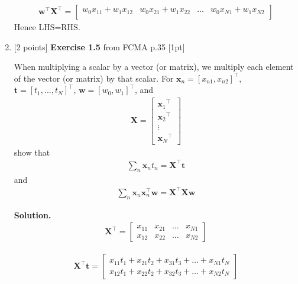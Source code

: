 \documentclass[10pt]{article}
\begin{document}
\begin{enumerate}
\begin{eqnarray*}
\mathbf{w}^\top\mathbf{X}^\top = 
    \begin{bmatrix}
    w_0 x_{11}+w_1x_{12}  & w_0x_{21}+w_1x_{22} & \hdots & w_0x_{N1}+w_1x_{N2}\\[0.3em]
    \end{bmatrix}
\end{eqnarray*}
Hence LHS=RHS.\\

\item \label{prob:5} [2 points]
{\bf Exercise 1.5} from FCMA p.35  [1pt]

When multiplying a scalar by a vector (or matrix), we multiply each element of the vector (or matrix) by that scalar.  For $\mathbf{x}_n = {[ x_{n1}, x_{n2} ]}^\top$, $\mathbf{t} = {[ t_1,...,t_N ]}^\top$, $\mathbf{w} = {[ w_0, w_1 ]}^\top$, and
\begin{eqnarray*}
\mathbf{X} = 
    \begin{bmatrix}
    {\mathbf{x}_{1}}^\top \\[0.3em]
    {\mathbf{x}_{2}}^\top \\[0.3em]
    \vdots \\[0.3em]
    {\mathbf{x}_{N}}^\top
    \end{bmatrix}
\end{eqnarray*}
show that
\begin{eqnarray*}
\sum_{n} \mathbf{x}_n t_n = \mathbf{X}^\top\mathbf{t}
\end{eqnarray*}
and
\begin{eqnarray*}
\sum_{n} \mathbf{x}_n \mathbf{x}_n ^\top \mathbf{w} = \mathbf{X}^\top\mathbf{X} \mathbf{w}
\end{eqnarray*}

{\bf Solution.}
\begin{eqnarray*}
\mathbf{X}^\top = 
    \begin{bmatrix}
    x_{11} & x_{21} & \hdots & x_{N1}\\[0.3em]
    x_{12} & x_{22} & \hdots & x_{N2}
    \end{bmatrix}
\end{eqnarray*}

\begin{eqnarray*}
\mathbf{X}^\top \mathbf{t}= 
    \begin{bmatrix}
    x_{11}t_1 + x_{21}t_2+x_{31}t_3+ \hdots + x_{N1}t_N\\[0.3em]
    x_{12}t_1 + x_{22}t_2+x_{32}t_3+ \hdots + x_{N2}t_N
    \end{bmatrix}
\end{eqnarray*}


\end{enumerate}
\end{document}

